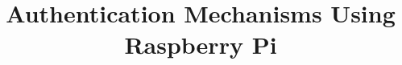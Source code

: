 \documentclass[a4paper, 10pt]{article}
\begin{document}
\title{Authentication Mechanisms Using Raspberry Pi}

\maketitle










% 

% 
% 
% 
% 
% 



\end{document}
